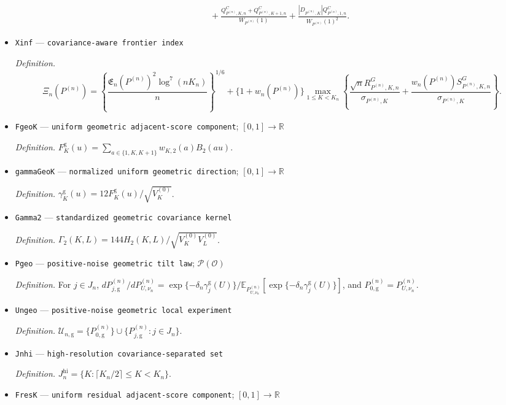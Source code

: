 \documentclass{article}
\begin{document}
\begin{itemize}
\[\begin{aligned}
 &\quad+\frac{Q^C_{P^{(n)},K,n}+Q^C_{P^{(n)},K+1,n}}{W_{P^{(n)}}(1)}
 +\frac{|D_{P^{(n)},K}|Q^C_{P^{(n)},1,n}}{W_{P^{(n)}}(1)^2}.
 \end{aligned}
\]
  \item \texttt{Xinf} --- \texttt{covariance-\allowbreak{}aware frontier index}
  \par\smallskip\noindent\emph{Definition.} \[\Xi_n(P^{(n)})=\left\{\frac{\mathfrak E_n(P^{(n)})^2\log^7(nK_n)}{n}\right\}^{1/6}+\{1+w_n(P^{(n)})\}\max_{1\le K<K_n}\left\{\frac{\sqrt n R^G_{P^{(n)},K,n}}{\sigma_{P^{(n)},K}}+\frac{w_n(P^{(n)})S^G_{P^{(n)},K,n}}{\sigma_{P^{(n)},K}}\right\}.\]
  \item \texttt{FgeoK} --- \texttt{uniform geometric adjacent-\allowbreak{}score component}; \([0,1]\to\mathbb R\)
  \par\smallskip\noindent\emph{Definition.} \(F_K^{\mathrm g}(u)=\sum_{a\in\{1,K,K+1\}}w_{K,2}(a)B_2(au)\).
  \item \texttt{gammaGeoK} --- \texttt{normalized uniform geometric direction}; \([0,1]\to\mathbb R\)
  \par\smallskip\noindent\emph{Definition.} \(\gamma_K^{\mathrm g}(u)=12F_K^{\mathrm g}(u)/\sqrt{V_K^{(0)}}\).
  \item \texttt{Gamma2} --- \texttt{standardized geometric covariance kernel}
  \par\smallskip\noindent\emph{Definition.} \(\Gamma_2(K,L)=144H_2(K,L)/\sqrt{V_K^{(0)}V_L^{(0)}}\).
  \item \texttt{Pgeo} --- \texttt{positive-\allowbreak{}noise geometric tilt law}; \(\mathcal P(\mathcal O)\)
  \par\smallskip\noindent\emph{Definition.} For \(j\in J_n\), \(dP_{j,\mathrm g}^{(n)}/dP_{U,\nu_n}^{(n)}=\exp\{-\delta_n\gamma_j^{\mathrm g}(U)\}/\mathbb E_{P_{U,\nu_n}^{(n)}}[\exp\{-\delta_n\gamma_j^{\mathrm g}(U)\}]\), and \(P_{0,\mathrm g}^{(n)}=P_{U,\nu_n}^{(n)}\).
  \item \texttt{Ungeo} --- \texttt{positive-\allowbreak{}noise geometric local experiment}
  \par\smallskip\noindent\emph{Definition.} \(\mathcal U_{n,\mathrm g}=\{P_{0,\mathrm g}^{(n)}\}\cup\{P_{j,\mathrm g}^{(n)}:j\in J_n\}\).
  \item \texttt{Jnhi} --- \texttt{high-\allowbreak{}resolution covariance-\allowbreak{}separated set}
  \par\smallskip\noindent\emph{Definition.} \(J_n^{\mathrm{hi}}=\{K:\lceil K_n/2\rceil\leq K<K_n\}\).
  \item \texttt{FresK} --- \texttt{uniform residual adjacent-\allowbreak{}score component}; \([0,1]\to\mathbb R\)

\end{itemize}
\end{document}
